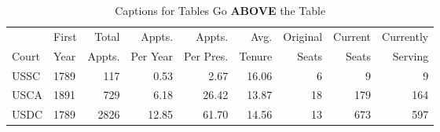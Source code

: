 \begin{table}[htbp]
\caption{Captions for Tables Go \textbf{ABOVE} the Table}
\label{tab:fjc_summary}
\begin{center}
\begin{tabular}{llrrrrrrr}
\toprule
& First & Total & Appts. & Appts. & Avg. & Original & Current & Currently\\
Court & Year & Appts. & Per Year & Per Pres. & Tenure & Seats & Seats & Serving\\
\midrule
USSC & 1789 & 117 & 0.53 & 2.67 & 16.06 & 6 & 9 & 9 \\ 
USCA & 1891 & 729 & 6.18 & 26.42 & 13.87 & 18 & 179 & 164 \\ 
USDC & 1789 & 2826 & 12.85 & 61.70 & 14.56 & 13 & 673 & 597 \\ 
\bottomrule
\end{tabular}
\end{center}
\end{table} 